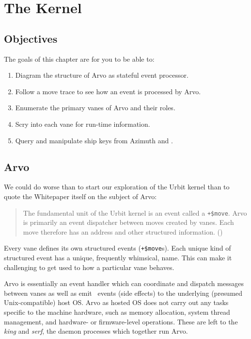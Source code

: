 \setchapterpreamble[u]{\margintoc}
\chapter{The Kernel}

\section{Objectives}

The goals of this chapter are for you to be able to:

\begin{enumerate}
  \item  Diagram the structure of Arvo as stateful event processor.
  \item  Follow a move trace to see how an event is processed by Arvo.
  \item  Enumerate the primary vanes of Arvo and their roles.
  \item  Scry into each vane for run-time information.
  \item  Query and manipulate ship keys from Azimuth and \jael.
\end{enumerate}


\section{Arvo}

We could do worse than to start our exploration of the Urbit kernel than to quote the Whitepaper itself on the subject of Arvo:

\begin{quote}
The fundamental unit of the Urbit kernel is an event called a \texttt{+\$move}.  Arvo is primarily an event dispatcher between moves created by vanes.  Each move therefore has an address and other structured information.  (\cite{Yarvin2017})
\end{quote}

Every vane defines its own structured events (\texttt{+\$move}s).  Each unique kind of structured event has a unique, frequently whimsical, name.  This can make it challenging to get used to how a particular vane behaves.


Arvo is essentially an event handler which can coordinate and dispatch messages between vanes as well as emit \unix~events (side effects) to the underlying (presumed Unix-compatible) host OS.  Arvo as hosted OS does not carry out any tasks specific to the machine hardware, such as memory allocation, system thread management, and hardware- or firmware-level operations.  These are left to the \emph{king} and \emph{serf}, the daemon processes which together run Arvo.

